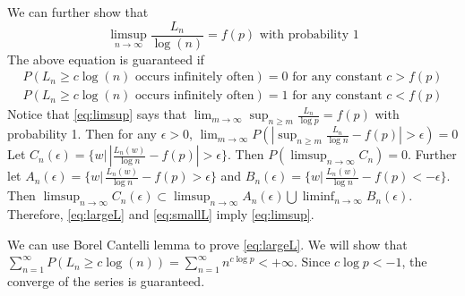\documentclass{article}
\begin{document}
\begin{enumerate}
We can further show that
\begin{equation}\label{eq:limsup}
    \limsup_{n\to \infty} \frac{L_n}{\log (n)}
     = f(p) \textrm{ with probability } 1
\end{equation}
The above equation is guaranteed if
\begin{align}
    P( L_n \geq c \log (n) \textrm{ occurs infinitely often}) = 0 \textrm{ for any constant } c > f(p) \label{eq:largeL}\\
    P( L_n \geq c \log (n) \textrm{ occurs infinitely often}) = 1 \textrm{ for any constant } c < f(p) \label{eq:smallL}
\end{align}
Notice that \eqref{eq:limsup} says that
$\lim_{m\to \infty} \sup_{n\geq m} \frac{L_n}{\log p} = f(p)$ with probability 1.
Then for any $\epsilon>0$,
$\lim_{m\to \infty}P(|\sup_{n\geq m} \frac{L_n}{\log n}-f(p)|>\epsilon)=0$
Let $C_n(\epsilon)=\{w\Big|\, | \frac{L_n(w)}{\log n}-f(p)|>\epsilon\}$.
Then $P(\limsup_{n\to\infty}C_n) = 0$.
Further let
$A_n(\epsilon)=\{w\Big|\,  \frac{L_n(w)}{\log n}-f(p)>\epsilon \}$ and 
$B_n(\epsilon)=\{w\Big|\,  \frac{L_n(w)}{\log n}-f(p)<-\epsilon \}$. Then $\limsup_{n\to \infty}C_n (\epsilon)\subset \limsup_{n\to \infty}A_n(\epsilon) \bigcup\liminf_{n\to\infty}B_n(\epsilon)$.
Therefore, \eqref{eq:largeL} and \eqref{eq:smallL} imply \eqref{eq:limsup}.

We can use Borel Cantelli lemma to prove
\eqref{eq:largeL}. We will show that
$\sum_{n=1}^{\infty} P(L_n\geq c\log (n))=\sum_{n=1}^{\infty} n^{c\log p} <+\infty$.
Since $c\log p < -1$, the converge of the series
is guaranteed.


\end{enumerate}
\end{document}
